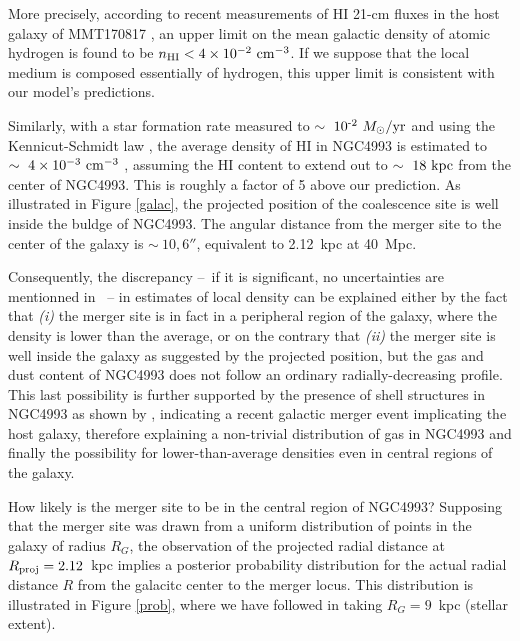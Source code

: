 More precisely, according to recent measurements of HI 21-cm fluxes in the host galaxy of MMT170817 \citep{12}, an upper limit on the mean galactic density of atomic hydrogen is found to be $n_{\rm{HI}} < 4 \times 10^{-2}~\rm{cm}^{-3}$. If we suppose that the local medium is composed essentially of hydrogen, this upper limit is consistent with our model's predictions.

Similarly, with a star formation rate measured to $\sim~10\sp{-2}~\Ms/\rm{yr}$ \citep{9} and using the Kennicut-Schmidt law  \citep{43}, the average density of HI in NGC4993 is estimated to $\sim~4 \times 10^{-3}~\rm{cm}^{-3}$ \citep{12}, assuming the HI content to extend out to $\sim~18~\rm{kpc}$ from the center of NGC4993. This is roughly a factor of 5 above our prediction. As illustrated in Figure \ref{galac}, the projected position of the coalescence site is well inside the buldge of NGC4993. The angular distance from the merger site to the center of the galaxy is $\sim~10,6''$, equivalent to 2.12~kpc at 40~Mpc.

Consequently, the discrepancy --~if it is significant, no uncertainties are mentionned in \citep{12}~-- in estimates of local density can be explained either by the fact that \textit{(i)} the merger site is in fact in a peripheral region of the galaxy, where the density is lower than the average, or on the contrary that \textit{(ii)} the merger site is well inside the galaxy as suggested by the projected position, but the gas and dust content of NGC4993 does not follow an ordinary radially-decreasing profile. This last possibility is further supported by the presence of shell structures in NGC4993 as shown by \citep{33}, indicating a recent galactic merger event implicating the host galaxy, therefore explaining a non-trivial distribution of gas in NGC4993 and finally the possibility for lower-than-average densities even in central regions of the galaxy.

How likely is the merger site to be in the central region of NGC4993? Supposing that the merger site was drawn from a uniform distribution of points in the galaxy of radius $R_G$, the observation of the projected radial distance at $R_\rm{proj} = 2.12$~kpc implies a posterior probability distribution for the actual radial distance $R$ from the galacitc center to the merger locus. This distribution is illustrated in Figure \ref{prob}, where we have followed \citep{12} in taking $R_G = 9$~kpc (stellar extent).


